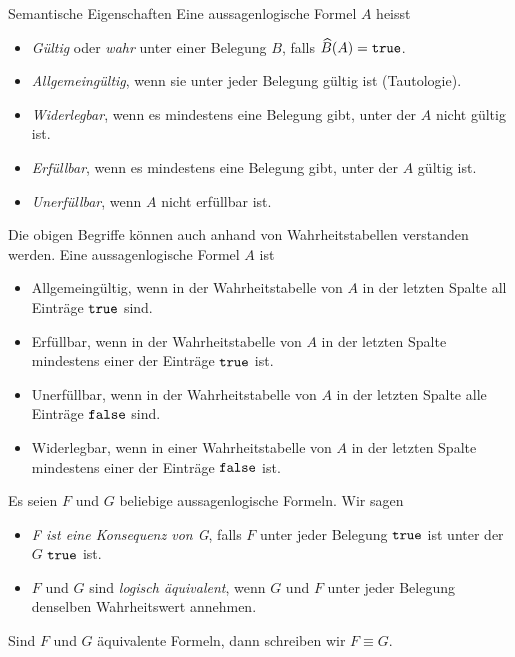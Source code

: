 \begin{definition}{Semantische Eigenschaften}
    Eine aussagenlogische Formel $A$ heisst
    \begin{itemize}
        \item \emph{Gültig} oder \emph{wahr} unter einer Belegung $B$, falls $\widehat{B}(A) = \texttt{true}$.
        \item \emph{Allgemeingültig}, wenn sie unter jeder Belegung gültig ist (Tautologie).
        \item \emph{Widerlegbar}, wenn es mindestens eine Belegung gibt, unter der $A$ nicht gültig ist.
        \item \emph{Erfüllbar}, wenn es mindestens eine Belegung gibt, unter der $A$ gültig ist.
        \item \emph{Unerfüllbar}, wenn $A$ nicht erfüllbar ist.
    \end{itemize}
\end{definition}

Die obigen Begriffe können auch anhand von Wahrheitstabellen verstanden werden.
Eine aussagenlogische Formel $A$ ist
\vspace{-\topsep}
\begin{itemize}
    \item Allgemeingültig, wenn in der Wahrheitstabelle von $A$ in der letzten Spalte all Einträge $\texttt{true}$ sind.
    \item Erfüllbar, wenn in der Wahrheitstabelle von $A$ in der letzten Spalte mindestens einer der Einträge $\texttt{true}$ ist.
    \item Unerfüllbar, wenn in der Wahrheitstabelle von $A$ in der letzten Spalte alle Einträge $\texttt{false}$ sind.
    \item Widerlegbar, wenn in einer Wahrheitstabelle von $A$ in der letzten Spalte mindestens einer der Einträge $\texttt{false}$ ist.
\end{itemize}

\begin{definition}{}
    Es seien $F$ und $G$ beliebige aussagenlogische Formeln.
    Wir sagen
    \begin{itemize}
        \item \emph{F ist eine Konsequenz von G}, falls $F$ unter jeder Belegung $\texttt{true}$ ist unter der $G$ $\texttt{true}$ ist.
        \item $F$ und $G$ sind \emph{logisch äquivalent}, wenn $G$ und $F$ unter jeder Belegung denselben Wahrheitswert annehmen.
    \end{itemize}
    Sind $F$ und $G$ äquivalente Formeln, dann schreiben wir $F \equiv G$.
\end{definition}

